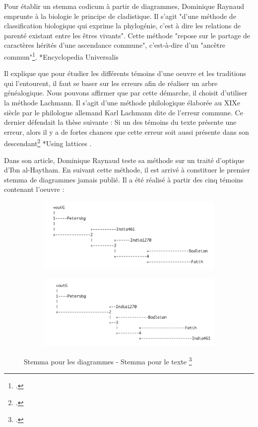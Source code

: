 \documentclass[a4paper,12pt,twoside]{book}
\begin{document}
	Pour établir un stemma codicum à partir de diagrammes, Dominique Raynaud emprunte à la biologie le principe de cladistique. Il s'agit "d'une méthode de classification biologique qui exprime la phylogénie, c'est à dire les relations de parenté existant entre les êtres vivants". Cette méthode "repose sur le partage de caractères hérités d'une ascendance commune", c'est-à-dire d'un "ancêtre commun"\footcite{tassyCLADISTIQUE2012}. *Encyclopedia Universalis
	
	Il explique que pour étudier les différents témoins d'une oeuvre et les traditions qui l'entourent, il faut se baser sur les erreurs afin de réaliser un arbre généalogique. Nous pouvons affirmer que par cette démarche, il choisit d'utiliser la méthode Lachmann. Il s'agit d'une méthode philologique élaborée au XIXe siècle par le philologue allemand Karl Lachmann dite de l'erreur commune. Ce dernier défendait la thèse suivante : Si un des témoins du texte présente une erreur, alors il y a de fortes chances que cette erreur soit aussi présente dans son descendant\footcite{pouliquenUsingLatticesReconstructing} *Using lattices .
	
	Dans son article, Dominique Raynaud teste sa méthode sur un traité d'optique d'Ibn al-Haytham. En suivant cette méthode, il est arrivé à constituer le premier stemma de diagrammes jamais publié. Il a été réalisé à partir des cinq témoins contenant l'oeuvre : 
	
	
	\begin{figure}[h]
		\centering
		\begin{subfigure}{0.48\linewidth}
			\centering
			\includegraphics[width=\linewidth]{images/diagram_stemma.png}
		\end{subfigure}
		\hfill
		\begin{subfigure}{0.48\linewidth}
			\centering
			\includegraphics[width=\linewidth]{images/text_stemma.png}
		\end{subfigure}
		\caption{Stemma pour les diagrammes - Stemma pour le texte \footcite{raynaudBuildingStemmaCodicum2014}}
		\label{fig:stemma}
	\end{figure}
\end{document}
